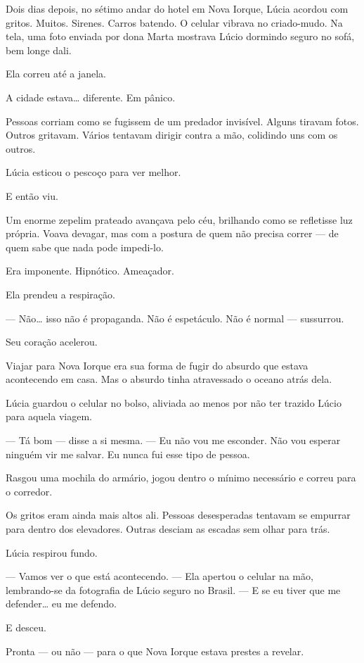 Dois dias depois, no sétimo andar do hotel em Nova Iorque, Lúcia acordou com gritos. Muitos.
Sirenes.  
Carros batendo.  
O celular vibrava no criado-mudo. Na tela, uma foto enviada por dona Marta mostrava Lúcio dormindo seguro no sofá, bem longe dali.

Ela correu até a janela.

A cidade estava… diferente.  
Em pânico.

Pessoas corriam como se fugissem de um predador invisível.  
Alguns tiravam fotos.  
Outros gritavam.  
Vários tentavam dirigir contra a mão, colidindo uns com os outros.

Lúcia esticou o pescoço para ver melhor.

E então viu.

Um enorme zepelim prateado avançava pelo céu, brilhando como se refletisse luz própria. Voava devagar, mas com a postura de quem não precisa correr — de quem sabe que nada pode impedi-lo.

Era imponente.  
Hipnótico.  
Ameaçador.

Ela prendeu a respiração.

— Não… isso não é propaganda. Não é espetáculo. Não é normal — sussurrou.

Seu coração acelerou.

Viajar para Nova Iorque era sua forma de fugir do absurdo que estava acontecendo em casa.  
Mas o absurdo tinha atravessado o oceano atrás dela.

Lúcia guardou o celular no bolso, aliviada ao menos por não ter trazido Lúcio para aquela viagem.

— Tá bom — disse a si mesma. — Eu não vou me esconder. Não vou esperar ninguém vir me salvar. Eu nunca fui esse tipo de pessoa.

Rasgou uma mochila do armário, jogou dentro o mínimo necessário e correu para o corredor.

Os gritos eram ainda mais altos ali.  
Pessoas desesperadas tentavam se empurrar para dentro dos elevadores.  
Outras desciam as escadas sem olhar para trás.

Lúcia respirou fundo.

— Vamos ver o que está acontecendo. — Ela apertou o celular na mão, lembrando-se da fotografia de Lúcio seguro no Brasil. — E se eu tiver que me defender… eu me defendo.

E desceu.

Pronta — ou não — para o que Nova Iorque estava prestes a revelar.
